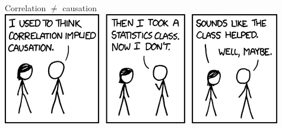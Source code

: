 \documentclass{beamer}\usepackage[]{graphicx}\usepackage[]{color}
\begin{document}
\begin{darkframes}
    \begin{frame}{Correlation $\neq$ causation}
      \includegraphics[width=\textwidth]{xkcd}
    \end{frame}
  \end{darkframes}
\end{document}
